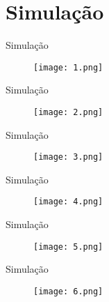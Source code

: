 \section{Simulação}

\begin{frame}{Simulação}

  \begin{figure}[ht]
    \centering
    \texttt{[image: 1.png]}
  \end{figure}

\end{frame}

\begin{frame}{Simulação}

  \begin{figure}[ht]
    \centering
    \texttt{[image: 2.png]}
  \end{figure}

\end{frame}

\begin{frame}{Simulação}

  \begin{figure}[ht]
    \centering
    \texttt{[image: 3.png]}
  \end{figure}

\end{frame}

\begin{frame}{Simulação}

  \begin{figure}[ht]
    \centering
    \texttt{[image: 4.png]}
  \end{figure}

\end{frame}

\begin{frame}{Simulação}

  \begin{figure}[ht]
    \centering
    \texttt{[image: 5.png]}
  \end{figure}

\end{frame}

\begin{frame}{Simulação}

  \begin{figure}[ht]
    \centering
    \texttt{[image: 6.png]}
  \end{figure}

\end{frame}

